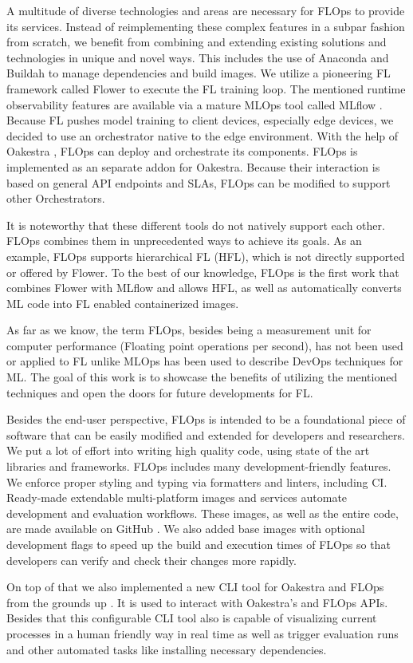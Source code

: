 A multitude of diverse technologies and areas are necessary
for FLOps to provide its services.
Instead of reimplementing these complex features in a subpar fashion from scratch,
we benefit from combining and extending existing solutions and technologies in unique and novel ways.
This includes the use of Anaconda \cite{anaconda_docs} and Buildah \cite{buildah_homepage}
to manage dependencies and build images.
We utilize a pioneering FL framework called Flower \cite{flower_docs} to execute the FL training loop.
The mentioned runtime observability features are available via a mature MLOps tool called MLflow \cite{mlflow_docs}.
Because FL pushes model training to client devices, especially edge devices,
we decided to use an orchestrator native to the edge environment.
With the help of Oakestra \cite{paper:oakestra_usenix}, FLOps can deploy and orchestrate its components.
FLOps is implemented as an separate addon for Oakestra.
Because their interaction is based on general API endpoints and SLAs,
FLOps can be modified to support other Orchestrators.

It is noteworthy that these different tools do not natively support each other.
FLOps combines them in unprecedented ways to achieve its goals.
As an example, FLOps supports hierarchical FL (HFL), which is not directly supported or offered by Flower.
To the best of our knowledge, FLOps is the first work that combines Flower with MLflow and allows HFL,
as well as automatically converts ML code into FL enabled containerized images.

As far as we know, the term FLOps, besides being a measurement unit for computer performance (Floating point operations per second),
has not been used or applied to FL unlike MLOps has been used to describe DevOps techniques for ML.
The goal of this work is to showcase the benefits of utilizing the mentioned techniques and
open the doors for future developments for FL.


Besides the end-user perspective, FLOps is intended to be a foundational piece of software
that can be easily modified and extended for developers and researchers.
We put a lot of effort into writing high quality code, using state of the art libraries and frameworks.
FLOps includes many development-friendly features.
We enforce proper styling and typing via formatters and linters, including CI.
Ready-made extendable multi-platform images and services automate development and evaluation workflows.
These images, as well as the entire code, are made available on GitHub \cite{flops_code}.
We also added base images with optional development flags to speed up the build and execution times of FLOps
so that developers can verify and check their changes more rapidly.

On top of that we also implemented a new CLI tool for Oakestra and FLOps from the grounds up \cite{cli_code}.
It is used to interact with Oakestra's and FLOps APIs.
Besides that this configurable CLI tool also is capable of visualizing 
current processes in a human friendly way in real time as well as trigger evaluation runs and
other automated tasks like installing necessary dependencies.